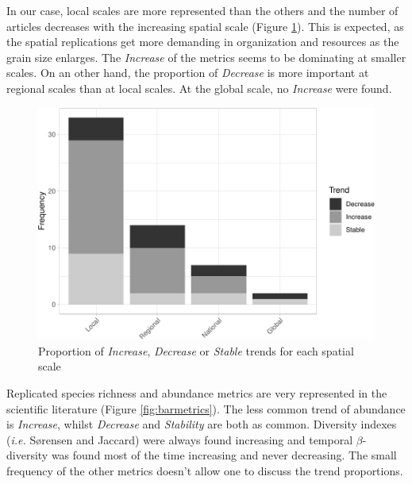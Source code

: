 \documentclass[
  12pt,
  oneside]{report}
\begin{document}
In our case, local scales are more represented than the others and the number of articles decreases with the increasing spatial scale (Figure \ref{fig:barspatscale}). This is expected, as the spatial replications get more demanding in organization and resources as the grain size enlarges. The \emph{Increase} of the metrics seems to be dominating at smaller scales. On an other hand, the proportion of \emph{Decrease} is more important at regional scales than at local scales. At the global scale, no \emph{Increase} were found.

\begin{figure}
\centering
\includegraphics{literature_review_files/figure-latex/barspatscale-1.pdf}
\caption{\label{fig:barspatscale}Proportion of \emph{Increase}, \emph{Decrease} or \emph{Stable} trends for each spatial scale}
\end{figure}

Replicated species richness and abundance metrics are very represented in the scientific literature (Figure \ref{fig:barmetrics}). The less common trend of abundance is \emph{Increase}, whilst \emph{Decrease} and \emph{Stability} are both as common. Diversity indexes (\emph{i.e.} Sørensen and Jaccard) were always found increasing and temporal \(\beta\)-diversity was found most of the time increasing and never decreasing. The small frequency of the other metrics doesn't allow one to discuss the trend proportions.
\end{document}
